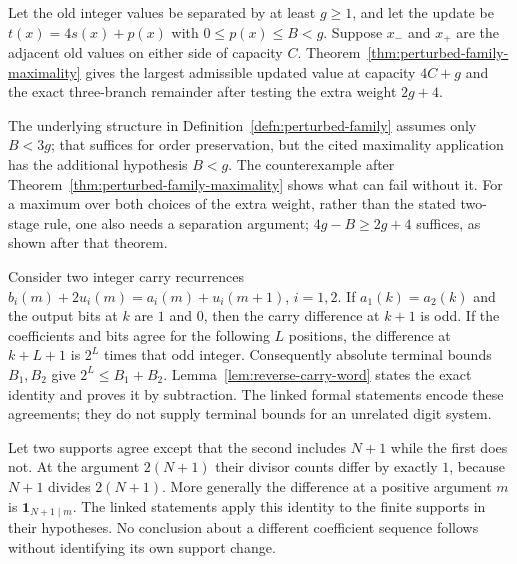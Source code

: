 \begin{thm}\label{record:257bm-i15}
Let the old integer values be separated by at least $g\ge1$,
and let the update be $t(x)=4s(x)+p(x)$ with
$0\le p(x)\le B<g$.  Suppose $x_-$ and $x_+$ are the adjacent
old values on either side of capacity $C$.
Theorem~\ref{thm:perturbed-family-maximality} gives the largest
admissible updated value at capacity $4C+g$ and the exact three-branch
remainder after testing the extra weight $2g+4$.

The underlying structure in
Definition~\ref{defn:perturbed-family} assumes only $B<3g$;
that suffices for order preservation, but the cited maximality
application has the additional hypothesis $B<g$.
The counterexample after Theorem~\ref{thm:perturbed-family-maximality}
shows what can fail without it.  For a maximum over both choices of the extra weight, rather than
the stated two-stage rule, one also needs a separation argument;
$4g-B\ge2g+4$ suffices, as shown after that theorem.
\end{thm}

\begin{thm}\label{record:257bm-i16}
Consider two integer carry recurrences
$b_i(m)+2u_i(m)=a_i(m)+u_i(m+1)$, $i=1,2$.
If $a_1(k)=a_2(k)$ and the output bits at $k$ are $1$ and $0$,
then the carry difference at $k+1$ is odd.  If the coefficients
and bits agree for the following $L$ positions, the difference
at $k+L+1$ is $2^L$ times that odd integer.
Consequently absolute terminal bounds $B_1,B_2$ give
$2^L\le B_1+B_2$.
Lemma~\ref{lem:reverse-carry-word} states the exact identity and
proves it by subtraction.  The linked formal statements encode
these agreements; they do not supply terminal bounds for an
unrelated digit system.
\end{thm}

\begin{prop}\label{record:257bm-i17}
Let two supports agree except that the second includes $N+1$
while the first does not.  At the argument $2(N+1)$ their divisor
counts differ by exactly $1$, because $N+1$ divides $2(N+1)$.
More generally the difference at a positive argument $m$ is
$\mathbf1_{N+1\mid m}$.  The linked statements apply this identity
to the finite supports in their hypotheses.  No conclusion about
a different coefficient sequence follows without identifying its
own support change.
\end{prop}

